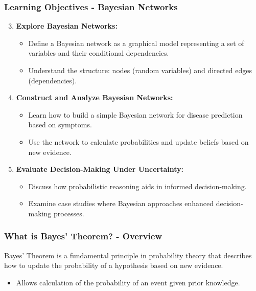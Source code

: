 \documentclass[aspectratio=169]{beamer}
\begin{document}
\begin{frame}[fragile]
    \frametitle{Learning Objectives - Bayesian Networks}
    \begin{enumerate}
        \setcounter{enumi}{2}
        \item \textbf{Explore Bayesian Networks:}
        \begin{itemize}
            \item Define a Bayesian network as a graphical model representing a set of variables and their conditional dependencies.
            \item Understand the structure: nodes (random variables) and directed edges (dependencies).
        \end{itemize}
        
        \item \textbf{Construct and Analyze Bayesian Networks:}
        \begin{itemize}
            \item Learn how to build a simple Bayesian network for disease prediction based on symptoms.
            \item Use the network to calculate probabilities and update beliefs based on new evidence.
        \end{itemize}
        
        \item \textbf{Evaluate Decision-Making Under Uncertainty:}
        \begin{itemize}
            \item Discuss how probabilistic reasoning aids in informed decision-making.
            \item Examine case studies where Bayesian approaches enhanced decision-making processes.
        \end{itemize}
    \end{enumerate}
\end{frame}

\begin{frame}[fragile]
    \frametitle{What is Bayes' Theorem? - Overview}
    Bayes' Theorem is a fundamental principle in probability theory that describes how to update the probability of a hypothesis based on new evidence. 
    \begin{itemize}
        \item Allows calculation of the probability of an event given prior knowledge.
    \end{itemize}
\end{frame}
\end{document}
